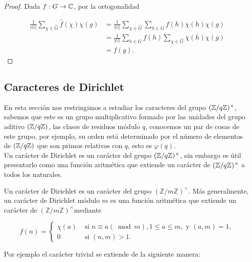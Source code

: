 \begin{proof}
Dada $f:G\to \mathbb{C}$, por la ortogonalidad

\begin{align*}
    \frac{1}{|G|}\sum_{\chi \in \widehat{G}}\widehat{f}(\chi) \chi(g)&=\frac{1}{|G|}\sum_{\chi \in \widehat{G}}\sum_{h\in G} f(h) \overline{\chi}(h) \chi(g)\\
    &=\frac{1}{|G|}\sum_{h\in G} f(h) \sum_{\chi \in \widehat{G}}\overline{\chi}(h) \chi(g)\\
    &=f(g)
.\end{align*}

\end{proof}



\subsection{Caracteres de Dirichlet}

En esta sección nos restringimos a estudiar los caracteres del grupo $(\mathbb{Z}/q\mathbb{Z})^{\times}$, sabemos que este es un grupo multiplicativo formado por las unidades del grupo aditivo $(\mathbb{Z}/q\mathbb{Z})$, las clases de residuos módulo $q$, conocemos un par de cosas de este grupo, por ejemplo, su orden está determinado por el número de elementos de $(\mathbb{Z}/q\mathbb{Z})$ que son primos relativos con $q$, esto es $\varphi(q)$.\\

Un carácter de Dirichlet es un carácter del grupo $(\mathbb{Z}/q\mathbb{Z})^{\times}$, sin embargo es útil presentarlo como una función aritmética que extiende un carácter de $(\mathbb{Z}/q\mathbb{Z})^{\times}$ a todos los naturales.

\begin{definition}
Un carácter de Dirichlet es un carácter del grupo $(\mathbb{Z} / m \mathbb{Z})^{\times}$. Más generalmente, un carácter de Dirichlet módulo $m$ es una función aritmética que extiende un carácter de $(\mathbb{Z} / m \mathbb{Z})^{\times}$mediante

$$
f(n)= \begin{cases}\chi(a) & \text { si } n \equiv a (\bmod{m}), 1 \leq a \leq m, \text{ y }(a, m)=1, \\ 0 & \text { si }(n, m)>1.\end{cases}
$$

\end{definition}

Por ejemplo el carácter trivial se extiende de la  siguiente manera:

